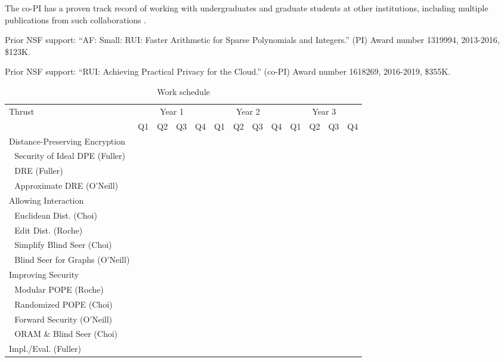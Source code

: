 \documentclass[11pt]{article}
\theoremstyle{remark}
\begin{document}
The co-PI has a proven track record of working with undergraduates and
graduate students at other institutions,
including multiple publications from such collaborations
\cite{AGR13,AGR14,AGR15,AR14,KRT15,GR16}.

Prior NSF support: ``AF: Small: RUI: Faster Arithmetic for Sparse
Polynomials and Integers.'' (PI) Award number 1319994, 2013-2016, \$123K.

Prior NSF support: ``RUI: Achieving Practical Privacy for the Cloud.''
(co-PI) Award number 1618269, 2016-2019, \$355K.

\begin{table}[t]
\small
\begin{tabular}{l | c | c | c | c | c | c | c | c | c | c | c | c}
Thrust & \multicolumn{4}{c}{Year 1} & \multicolumn{4}{c}{Year 2} & \multicolumn{4}{c}{Year 3} \\
& Q1 & Q2 & Q3 & Q4 & Q1 & Q2 & Q3 & Q4 & Q1 & Q2 & Q3 & Q4\\\hline
Distance-Preserving Encryption\\
\,\,\,\,Security of Ideal DPE (Fuller) & \multicolumn{4}{c}{\cellcolor{blue!25}}\\
\,\,\,\,DRE (Fuller) & \multicolumn{4}{c}{} &\multicolumn{5}{c}{\cellcolor{blue!25}} \\
\,\,\,\,Approximate DRE (O'Neill) &\multicolumn{6}{c}{\cellcolor{blue!25}} \\
Allowing Interaction \\
\,\,\,\,Euclidean Dist. (Choi) &\multicolumn{4}{c}{\cellcolor{blue!25}} \\
\,\,\,\,Edit Dist. (Roche) & & \multicolumn{6}{c}{\cellcolor{blue!25}} \\
\,\,\,\,Simplify Blind Seer (Choi) & \multicolumn{4}{c}{} & \multicolumn{4}{c}{\cellcolor{blue!25}} \\
\,\,\,\,Blind Seer for Graphs (O'Neill) & \multicolumn{7}{c}{} & \multicolumn{5}{c}{\cellcolor{blue!25}}\\
Improving Security\\
\,\,\,\,Modular POPE (Roche) & \multicolumn{3}{c}{}& \multicolumn{4}{c}{\cellcolor{blue!25}}\\
\,\,\,\,Randomized POPE (Choi) & \multicolumn{7}{c}{} & \multicolumn{3}{c}{\cellcolor{blue!25}}\\
\,\,\,\,Forward Security (O'Neill) & \multicolumn{7}{c}{} & \multicolumn{5}{c}{\cellcolor{blue!25}}\\
\,\,\,\,ORAM \& Blind Seer (Choi) & \multicolumn{6}{c}{}& \multicolumn{6}{c}{\cellcolor{blue!25}}\\
Impl./Eval. (Fuller) & \multicolumn{4}{c}{} &  \multicolumn{8}{c}{\cellcolor{blue!25}}\\
\end{tabular}
\caption{Work schedule}
\label{tab:work}
\end{table}
\end{document}
